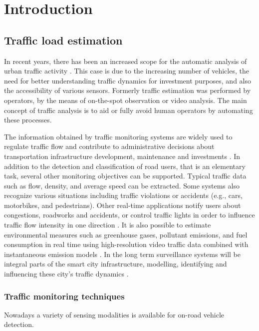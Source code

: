 \renewcommand{\thechapter}{\Alph{chapter}}
\chapter*{Introduction}\label{chap:introduction}\setcounter{chapter}{9} 
\section{Traffic load estimation}
In recent years, there has been an increased scope for the automatic analysis of urban traffic activity \cite{Buch2011}.
This case is due to the increasing number of vehicles, the need for better understanding traffic dynamics for investment purposes, and also the accessibility of various sensors.
Formerly traffic estimation was performed by operators, by the means of on-the-spot observation or video analysis.
The main concept of traffic analysis is to aid or fully avoid human operators by automating these processes.

The information obtained by traffic monitoring systems are widely used to regulate traffic flow and contribute to administrative decisions about transportation infrastructure development, maintenance and investments \cite{MagyarKozut}.
In addition to the detection and classification of road users, that is an elementary task, several other monitoring objectives can be supported. 
Typical traffic data such as flow, density, and average speed can be extracted.
Some systems also recognize various situations including traffic violations or accidents (e.g., cars, motorbikes, and pedestrians).
Other real-time applications notify users about congestions, roadworks and accidents, or control traffic lights in order to influence traffic flow intensity in one direction \cite{AzoSensor, Thiruverahan2015, Ghazal2016}.
It is also possible to estimate environmental measures such as greenhouse gases, pollutant emissions, and fuel consumption in real time using high-resolution video traffic data combined with instantaneous emission models \cite{Morris2012a}. 
In the long term surveillance systems will be integral parts of the smart city infrastructure, modelling, identifying and influencing these city's traffic dynamics \cite{SOLSUN}.

\subsection{Traffic monitoring techniques}
Nowadays a variety of sensing modalities is available for on-road vehicle detection.

